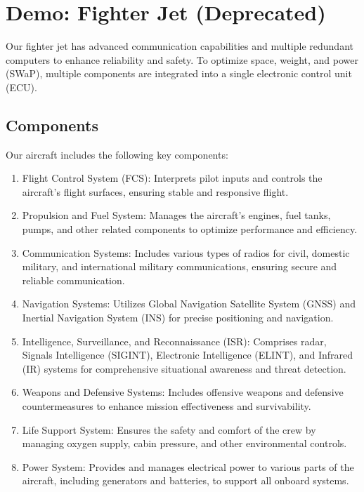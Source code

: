 \newpage
\section{Demo: Fighter Jet (Deprecated)}
Our fighter jet has advanced communication capabilities and multiple redundant computers to enhance reliability and safety. 
To optimize space, weight, and power (SWaP), multiple components are integrated into a single electronic control unit (ECU).

\subsection{Components}
Our aircraft includes the following key components:
\begin{enumerate}[label=P\arabic*)]
	\item Flight Control System (FCS): 
		Interprets pilot inputs and controls the aircraft's flight surfaces, ensuring stable and responsive flight.
	\item Propulsion and Fuel System: 
		Manages the aircraft's engines, fuel tanks, pumps, and other related components to optimize performance and efficiency.
	\item Communication Systems: 
		Includes various types of radios for civil, domestic military, and international military communications, ensuring secure and reliable communication.
	\item Navigation Systems: 
		Utilizes Global Navigation Satellite System (GNSS) and Inertial Navigation System (INS) for precise positioning and navigation.
	\item Intelligence, Surveillance, and Reconnaissance (ISR): 
		Comprises radar, Signals Intelligence (SIGINT), Electronic Intelligence (ELINT), and Infrared (IR) systems for comprehensive situational awareness and threat detection.
	\item Weapons and Defensive Systems: 
		Includes offensive weapons and defensive countermeasures to enhance mission effectiveness and survivability.
	\item Life Support System: 
		Ensures the safety and comfort of the crew by managing oxygen supply, cabin pressure, and other environmental controls.
	\item Power System: 
		Provides and manages electrical power to various parts of the aircraft, including generators and batteries, to support all onboard systems.
\end{enumerate}


